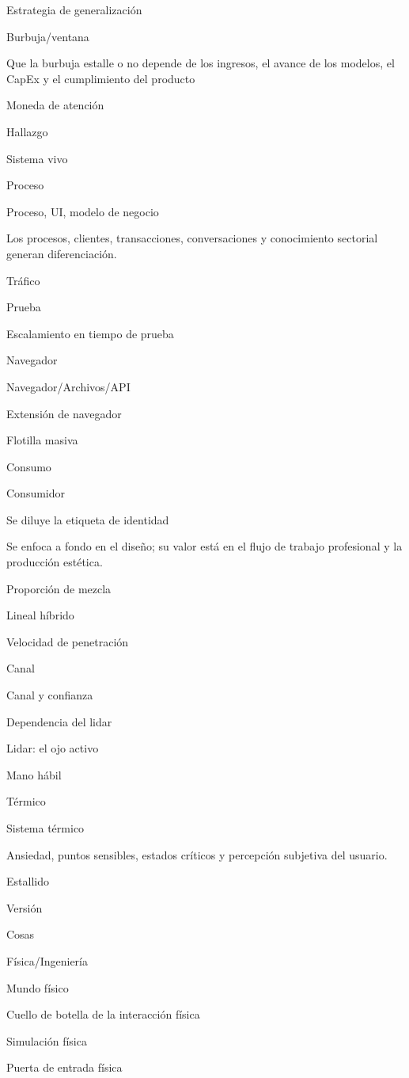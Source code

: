 \documentclass{article}
\begin{document}
Estrategia de generalización

Burbuja/ventana

Que la burbuja estalle o no depende de los ingresos, el avance de los modelos, el CapEx y el cumplimiento del producto

Moneda de atención

Hallazgo

Sistema vivo

Proceso

Proceso, UI, modelo de negocio

Los procesos, clientes, transacciones, conversaciones y conocimiento sectorial generan diferenciación.

Tráfico

Prueba

Escalamiento en tiempo de prueba

Navegador

Navegador/Archivos/API

Extensión de navegador

Flotilla masiva

Consumo

Consumidor

Se diluye la etiqueta de identidad

Se enfoca a fondo en el diseño; su valor está en el flujo de trabajo profesional y la producción estética.

Proporción de mezcla

Lineal híbrido

Velocidad de penetración

Canal

Canal y confianza

Dependencia del lidar

Lidar: el ojo activo

Mano hábil

Térmico

Sistema térmico

Ansiedad, puntos sensibles, estados críticos y percepción subjetiva del usuario.

Estallido

Versión

Cosas

Física/Ingeniería

Mundo físico

Cuello de botella de la interacción física

Simulación física

Puerta de entrada física
\end{document}
